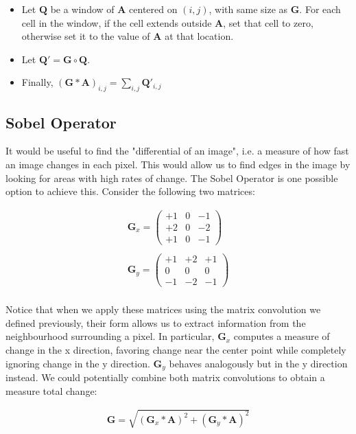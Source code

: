 \documentclass{article}
\begin{document}
\begin{itemize}
\item Let $\mathbf{Q}$ be a window of $\mathbf{A}$ centered on $(i, j)$, with same size as $\mathbf{G}$. For each cell in the window, if the cell extends outside $\mathbf{A}$, set that cell to zero, otherwise set it to the value of $\mathbf{A}$ at that location.
\item Let $\mathbf{Q}' = \mathbf{G} \circ \mathbf{Q}$.
\item Finally, $(\mathbf{G} * \mathbf{A})_{i, j} = \sum_{i, j} \mathbf{Q}'_{i, j}$
\end{itemize}

\subsection{Sobel Operator}

It would be useful to find the "differential of an image", i.e. a measure of how fast an image changes in each pixel. This would allow us to find edges in the image by looking for areas with high rates of change. The Sobel Operator \cite{EdgeDetection} is one possible option to achieve this. Consider the following two matrices:

\begin{gather*}
\mathbf{G}_x
=
\begin{pmatrix}
+1 & 0 & -1 \\
+2 & 0 & -2 \\
+1 & 0 & -1
\end{pmatrix} \\
\\
\mathbf{G}_y
=
\begin{pmatrix}
+1 & +2 & +1 \\
0 & 0 & 0 \\
-1 & -2 & -1
\end{pmatrix} \\
\end{gather*}

Notice that when we apply these matrices using the matrix convolution we defined previously, their form allows us to extract information from the neighbourhood surrounding a pixel. In particular, $\mathbf{G}_x$ computes a measure of change in the x direction, favoring change near the center point while completely ignoring change in the y direction. $\mathbf{G}_y$ behaves analogously but in the y direction instead. We could potentially combine both matrix convolutions to obtain a measure total change:

\begin{gather*}
\mathbf{G} = \sqrt{(\mathbf{G}_x * \mathbf{A})^2 + (\mathbf{G}_y * \mathbf{A})^2} \\
\end{gather*}
\end{document}
